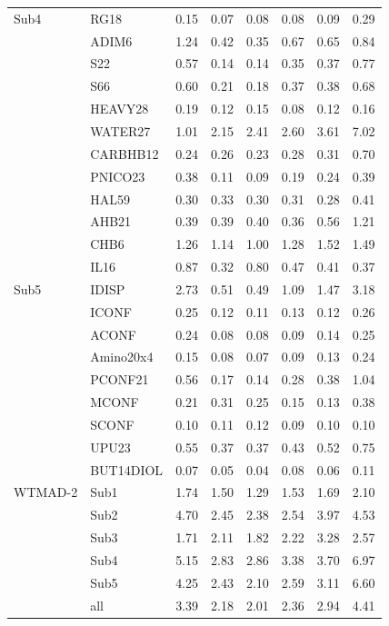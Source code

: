 \begin{ThreePartTable}
\begin{longtable}{lld{2.2}d{2.2}d{2.2}d{2.2}d{2.2}d{2.2}}
  Sub4    & RG18      & 0.15  & 0.07  & 0.08  & 0.08   & 0.09  & 0.29  \\
          & ADIM6     & 1.24  & 0.42  & 0.35  & 0.67   & 0.65  & 0.84  \\
          & S22       & 0.57  & 0.14  & 0.14  & 0.35   & 0.37  & 0.77  \\
          & S66       & 0.60  & 0.21  & 0.18  & 0.37   & 0.38  & 0.68  \\
          & HEAVY28   & 0.19  & 0.12  & 0.15  & 0.08   & 0.12  & 0.16  \\
          & WATER27   & 1.01  & 2.15  & 2.41  & 2.60   & 3.61  & 7.02  \\
          & CARBHB12  & 0.24  & 0.26  & 0.23  & 0.28   & 0.31  & 0.70  \\
          & PNICO23   & 0.38  & 0.11  & 0.09  & 0.19   & 0.24  & 0.39  \\
          & HAL59     & 0.30  & 0.33  & 0.30  & 0.31   & 0.28  & 0.41  \\
          & AHB21     & 0.39  & 0.39  & 0.40  & 0.36   & 0.56  & 1.21  \\
          & CHB6      & 1.26  & 1.14  & 1.00  & 1.28   & 1.52  & 1.49  \\
          & IL16      & 0.87  & 0.32  & 0.80  & 0.47   & 0.41  & 0.37  \\ \midrule
  Sub5    & IDISP     & 2.73  & 0.51  & 0.49  & 1.09   & 1.47  & 3.18  \\
          & ICONF     & 0.25  & 0.12  & 0.11  & 0.13   & 0.12  & 0.26  \\
          & ACONF     & 0.24  & 0.08  & 0.08  & 0.09   & 0.14  & 0.25  \\
          & Amino20x4 & 0.15  & 0.08  & 0.07  & 0.09   & 0.13  & 0.24  \\
          & PCONF21   & 0.56  & 0.17  & 0.14  & 0.28   & 0.38  & 1.04  \\
          & MCONF     & 0.21  & 0.31  & 0.25  & 0.15   & 0.13  & 0.38  \\
          & SCONF     & 0.10  & 0.11  & 0.12  & 0.09   & 0.10  & 0.10  \\
          & UPU23     & 0.55  & 0.37  & 0.37  & 0.43   & 0.52  & 0.75  \\
          & BUT14DIOL & 0.07  & 0.05  & 0.04  & 0.08   & 0.06  & 0.11  \\ \midrule
  WTMAD-2 & Sub1      & 1.74  & 1.50  & 1.29  & 1.53   & 1.69  & 2.10  \\
          & Sub2      & 4.70  & 2.45  & 2.38  & 2.54   & 3.97  & 4.53  \\
          & Sub3      & 1.71  & 2.11  & 1.82  & 2.22   & 3.28  & 2.57  \\
          & Sub4      & 5.15  & 2.83  & 2.86  & 3.38   & 3.70  & 6.97  \\
          & Sub5      & 4.25  & 2.43  & 2.10  & 2.59   & 3.11  & 6.60  \\
          & all       & 3.39  & 2.18  & 2.01  & 2.36   & 2.94  & 4.41  \\ \bottomrule
\end{longtable}
\end{ThreePartTable}

